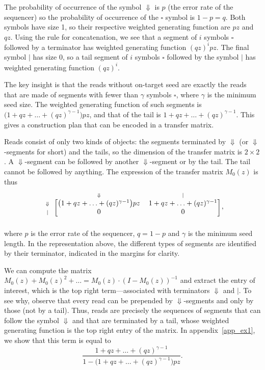 \documentclass{article}
\begin{document}
The probability of occurrence of the symbol $\Downarrow$ is $p$ (the error
rate of the sequencer) so the probability of occurrence of the $\square$
symbol is $1-p = q$. Both symbols have size 1, so their respective
weighted generating function are $pz$ and $qz$. Using the rule for
concatenation, we see that a segment of $i$ symbols $\square$ followed by
a terminator has weighted generating function $(qz)^ipz$. The final symbol
$|$ has size 0, so a tail segment of $i$ symbols $\square$ followed by the
symbol $|$ has weighted generating function $(qz)^i$.

The key insight is that the reads without on-target seed are exactly the
reads that are made of segments with fewer than $\gamma$ symbols
$\square$, where $\gamma$ is the minimum seed size. The weighted
generating function of such segments is $\big( 1+qz+\ldots+(qz)^{\gamma-1}
\big) pz$, and that of the tail is $1+qz+\ldots+(qz)^{\gamma-1}$. This
gives a construction plan that can be encoded in a transfer matrix.

Reads consist of only two kinds of objects: the segments terminated by
$\Downarrow$ (or $\Downarrow$-segments for short) and the tails, so the
dimension of the transfer matrix is $2 \times 2$. A $\Downarrow$-segment
can be followed by another $\Downarrow$-segment or by the tail. The tail
cannot be followed by anything. The expression of the transfer matrix
$M_0(z)$ is thus
\begin{equation*}
\begin{blockarray}{ccc}
   & \scriptstyle{\Downarrow} & \scriptstyle{|} \\
\begin{block}{c[cc]}
\scriptstyle{\Downarrow} & \big( 1+qz+\ldots+(qz)^{\gamma-1}
\big) pz  & 1+qz+\ldots+(qz)^{\gamma-1} \\
\scriptstyle{|} & 0 & 0 \\
\end{block}
\end{blockarray},
\end{equation*}
where $p$ is the error rate of the sequencer, $q=1-p$ and $\gamma$ is the
minimum seed length. In the representation above, the different types of
segments are identified by their terminator, indicated in the margins for
clarity.

We can compute the matrix $M_0(z) + M_0(z)^2 + \ldots = M_0(z) \cdot
(I-M_0(z))^{-1}$ and extract the entry of interest, which is the top right
term---associated with terminators $\Downarrow$ and $|$. To see why,
observe that every read can be prepended by $\Downarrow$-segments and only
by those (not by a tail). Thus, reads are precisely the sequences of
segments that can follow the symbol $\Downarrow$ and that are terminated
by a tail, whose weighted generating function is the top right entry of
the matrix. In appendix~\ref{app_ex1}, we show that this term is equal to
\begin{equation}
\label{eq:F}
\frac{1+qz+\ldots+(qz)^{\gamma-1}}
  {1-\big(1+qz+\ldots+(qz)^{\gamma-1} \big) pz}.
\end{equation}
\end{document}
